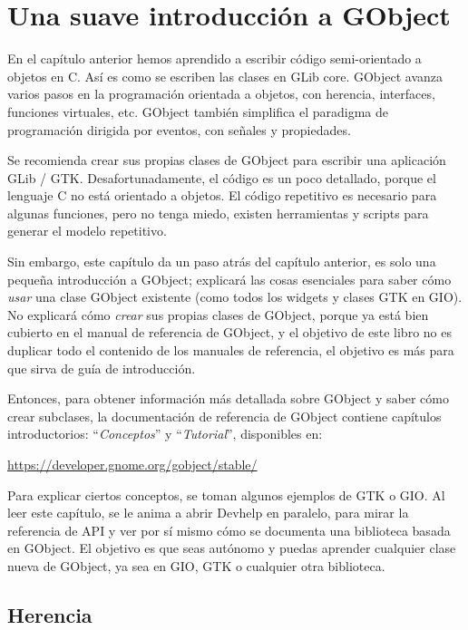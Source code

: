\chapter{Una suave introducción a GObject}
\label{oop-gobject}

En el capítulo anterior hemos aprendido a escribir código semi-orientado a objetos en C. Así es como se escriben las clases en GLib core. GObject avanza varios pasos en la programación orientada a objetos, con herencia, interfaces, funciones virtuales, etc. GObject también simplifica el paradigma de programación dirigida por eventos, con señales y propiedades.

Se recomienda crear sus propias clases de GObject para escribir una aplicación GLib / GTK. Desafortunadamente, el código es un poco detallado, porque el lenguaje C no está orientado a objetos. El código repetitivo es necesario para algunas funciones, pero no tenga miedo, existen herramientas y scripts para generar el modelo repetitivo.

Sin embargo, este capítulo da un paso atrás del capítulo anterior, es solo una pequeña introducción a GObject; explicará las cosas esenciales para saber cómo \emph{usar} una clase GObject existente (como todos los widgets y clases GTK en GIO). No explicará cómo \emph{crear} sus propias clases de GObject, porque ya está bien cubierto en el manual de referencia de GObject, y el objetivo de este libro no es duplicar todo el contenido de los manuales de referencia, el objetivo es más para que sirva de guía de introducción.

Entonces, para obtener información más detallada sobre GObject y saber cómo crear subclases, la documentación de referencia de GObject contiene capítulos introductorios: ``\emph{Conceptos}'' y ``\emph{Tutorial}'', disponibles en:

\url{https://developer.gnome.org/gobject/stable/}

Para explicar ciertos conceptos, se toman algunos ejemplos de GTK o GIO. Al leer este capítulo, se le anima a abrir Devhelp en paralelo, para mirar la referencia de API y ver por sí mismo cómo se documenta una biblioteca basada en GObject. El objetivo es que seas autónomo y puedas aprender cualquier clase nueva de GObject, ya sea en GIO, GTK o cualquier otra biblioteca.

\section{Herencia}
\label{oop-gobject-inheritance}

